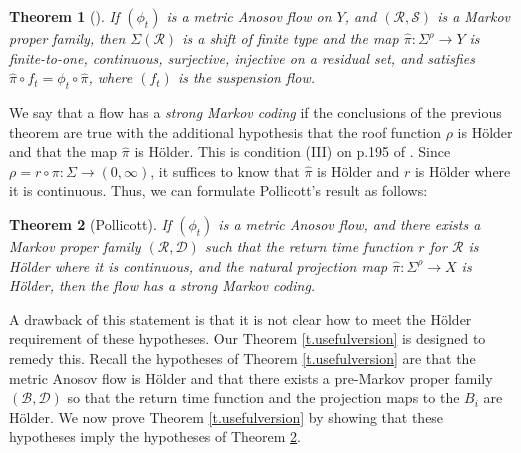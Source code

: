 \documentclass[11pt]{article}
\let\mathcal\mathscr
\newtheorem{thm}{Theorem}[section]
\theoremstyle{definition}
\numberwithin{equation}{section}
\newcommand\DDD{\mathcal D}
\newcommand\BBB{\mathcal B}
\newcommand\RRR{\mathcal R}
\newcommand\SSS{\mathcal S}
\begin{document}
\begin{thm}[{\cite[Th.\,1]{pollicott}}]
If $(\phi_t)$ is a metric Anosov flow on $Y$, and $(\RRR, \SSS)$ is a Markov proper family, then $\Sigma(\RRR)$ is a shift of finite type and the map $\hat\pi: \Sigma^\rho \to Y$ is finite-to-one, continuous, surjective, injective on a residual set, and satisfies $\hat \pi \circ f_t = \phi_t \circ \hat \pi$, where $(f_t)$ is the suspension flow.
\end{thm}

We say that a flow has a \emph{strong Markov coding} if the conclusions of the previous theorem are true with the additional hypothesis that the roof function $\rho$ is Hölder and that the map $\hat \pi$ is Hölder. This is condition (III) on p.195 of \cite{pollicott}. Since $\rho= r \circ \pi: \Sigma \to (0, \infty)$, it suffices to know that $\hat\pi$ is Hölder and $r$ is Hölder where it is continuous. Thus, we can formulate Pollicott's result as follows:

\begin{thm} [Pollicott] \label{t.pollicott}
If $(\phi_t)$ is a metric Anosov flow, and there exists a Markov proper family $(\RRR, \DDD)$ such that the return time function $r$ for $\RRR$ is Hölder where it is continuous, and the natural projection map $\hat \pi: \Sigma^\rho \to X$ is Hölder, then the flow has a strong Markov coding.
\end{thm}

A drawback of this statement is that it is not clear how to meet the Hölder \hbox{requirement} of these hypotheses. Our Theorem \ref{t.usefulversion} is designed to remedy this. Recall the hypotheses of Theorem \ref{t.usefulversion} are that the metric Anosov flow is Hölder and that there exists a pre-Markov proper family $(\BBB, \DDD)$ so that the return time function and the projection maps to the $B_i$ are Hölder. We now prove Theorem \ref{t.usefulversion} by showing that these hypotheses imply the hypotheses of Theorem \ref{t.pollicott}.
\end{document}
